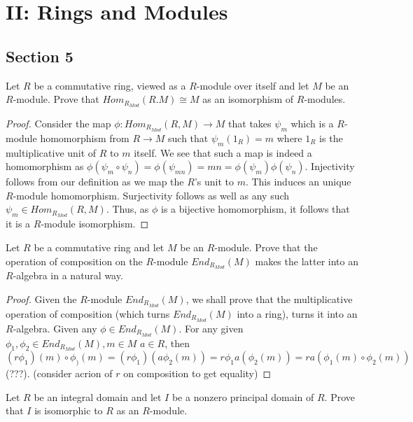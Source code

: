 \documentclass[Aluffi.tex]{subfiles}
\begin{document}
\section{II: Rings and Modules}

\subsection{Section 5}

\begin{problem}
Let $R$  be a commutative ring, viewed as a $R$-module over itself and let $M$ be an $R$-module.
Prove that $Hom_{R_{Mod}}(R.M) \cong M$ as an isomorphism of $R$-modules.
\end{problem}

\begin{proof}
Consider the map $\phi: Hom_{R_{Mod}}(R,M) \rightarrow M$ that takes $\psi_m$ which is a $R$-module homomorphism from $R \rightarrow M$ such that $\psi_m(1_R)= m$ where $1_R$ is the multiplicative unit of $R$
to $m$ itself. We see that such a map is indeed a homomorphism as $\phi(\psi_m   \circ \psi_n)= \phi(\psi_{mn}) = mn = \phi(\psi_m)\phi(\psi_n)$. Injectivity follows from our definition as we map the $R$'s unit to $m$. This induces an unique $R$-module homomorphism. Surjectivity follows as well as any such $\psi
_{m} \in Hom_{R_{Mod}}(R,M)$. Thus, as $\phi$ is a bijective homomorphism, it follows that it is a $R$-module isomorphism.
\end{proof}

\begin{problem}
Let $R$ be a commutative ring and let $M$ be an $R$-module. Prove that the operation of composition on the $R$-module $End_{R_{Mod}}(M)$ makes the latter into an $R$-algebra in a natural way.
\end{problem}

\begin{proof}
Given the $R$-module $End_{R_{Mod}}(M)$, we shall prove that the multiplicative operation of composition (which turns $End_{R_{Mod}}(M)$ into a ring), turns it into an $R$-algebra. Given any $\phi \in End_{R_{Mod}}(M)$. For any given $\phi_1,\phi_2 \in End_{R_{Mod}}(M), m \in M$ $a \in R$, then  $(r\phi_1)(m) \circ \phi_)(m)  = (r\phi_1)(a\phi_2(m)) = r\phi_1a(\phi_2(m)) = ra(\phi_1(m) \circ \phi_2(m))$ (???). (consider acrion of $r$ on composition to get equality)
\end{proof}

\begin{problem}
Let $R$ be an integral domain and let $I$ be a nonzero principal domain of $R$. Prove that $I$ is isomorphic to $R$ as an $R$-module.
\end{problem}
\end{document}
